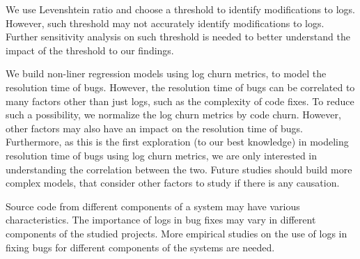 
We use Levenshtein ratio and choose a threshold to identify modifications to logs. However, such threshold may not accurately identify  modifications to logs. Further sensitivity analysis on such threshold is needed to better understand the impact of the threshold to our findings.

We build non-liner regression models using log churn metrics, to model the resolution time of bugs. However, the resolution time of bugs can be correlated to many factors other than just logs, such as the complexity of code fixes. To reduce such a possibility, we normalize the log churn metrics by code churn. However, other factors may also have an impact on the resolution time of bugs. Furthermore, as this is the first exploration (to our best knowledge) in modeling resolution time of bugs using log churn metrics, we are only interested in understanding the correlation between the two. Future studies should build more complex models, that consider other factors to study if there is any causation. 

Source code from different components of a system may have various characteristics. The importance of logs in bug fixes may vary in different components of the studied projects. More empirical studies on the use of logs in fixing bugs for different components of the systems are needed.



%

